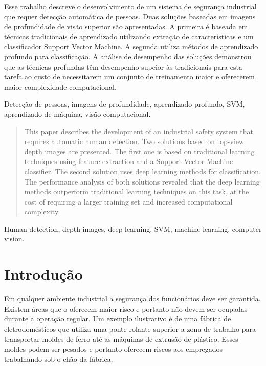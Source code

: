 \begin{resumo}
Esse trabalho descreve o desenvolvimento de um sistema de segurança industrial que requer detecção automática de pessoas. Duas soluções baseadas em imagens de profundidade de visão superior são apresentadas. A primeira é baseada em técnicas tradicionais de aprendizado utilizando extração de características e um classificador Support Vector Machine. A segunda utiliza métodos de aprendizado profundo para classificação. A análise de desempenho das soluções demonstrou que as técnicas profundas têm desempenho supeior às tradicionais para esta tarefa ao custo de necessitarem um conjunto de treinamento maior e oferecerem maior complexidade computacional.
\end{resumo}

\begin{chave}
Detecção de pessoas, imagens de profundidade, aprendizado profundo, SVM, aprendizado de máquina, visão computacional.
\end{chave}

\begin{abstract}
This paper describes the development of an industrial safety system that requires automatic human detection. Two solutions based on top-view depth images are presented. The first one is based on traditional learning techniques using feature extraction and a Support Vector Machine classifier. The second solution uses deep learning methods for classification. The performance analysis of both solutions revealed that the deep learning methods outperform traditional learning techniques on this task, at the cost of requiring a larger training set and increased computational complexity.
\end{abstract}

\begin{keywords}
  Human detection, depth images, deep learning, SVM, machine learning, computer vision.
\end{keywords}

\section{Introdução}
  Em qualquer ambiente industrial a segurança dos funcionários deve ser garantida. Existem áreas que o oferecem maior risco e portanto não devem ser ocupadas durante a operação regular. Um exemplo ilustrativo é de uma fábrica de eletrodomésticos que utiliza uma ponte rolante superior a zona de trabalho para transportar moldes de ferro até as máquinas de extrusão de plástico. Esses moldes podem ser pesados e portanto oferecem riscos aos empregados trabalhando sob o chão da fábrica.

